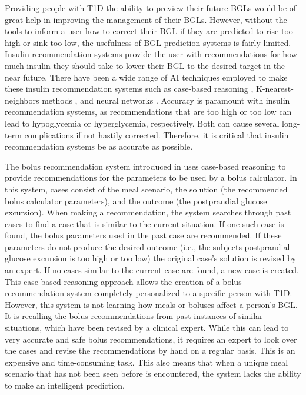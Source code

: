 Providing people with \ac{T1D} the ability to preview their future \ac{BGLs} would be of great help in improving the management of their BGLs. However, without the tools to inform a user how to correct their \ac{BGL} if they are predicted to rise too high or sink too low, the usefulness of \ac{BGL} prediction systems is fairly limited. Insulin recommendation systems provide the user with recommendations for how much insulin they should take to lower their \ac{BGL} to the desired target in the near future. There have been a wide range of AI techniques employed to make these insulin recommendation systems such as case-based reasoning \cite{pesl:case_based}, K-nearest-neighbors methods \cite{tyler:knn}, and neural networks \cite{zhu:bolus_drl}. Accuracy is paramount with insulin recommendation systems, as recommendations that are too high or too low can lead to hypoglycemia or hyperglycemia, respectively. Both can cause several long-term complications if not hastily corrected. Therefore, it is critical that insulin recommendation systems be as accurate as possible.

The bolus recommendation system introduced in \cite{pesl:case_based} uses case-based reasoning to provide recommendations for the parameters to be used by a bolus calculator. In this system, cases consist of the meal scenario, the solution (the recommended bolus calculator parameters), and the outcome (the postprandial glucose excursion). When making a recommendation, the system searches through past cases to find a case that is similar to the current situation. If one such case is found, the bolus parameters used in the past case are recommended. If these parameters do not produce the desired outcome (i.e., the subjects postprandial glucose excursion is too high or too low) the original case’s solution is revised by an expert. If no cases similar to the current case are found, a new case is created. This case-based reasoning approach allows the creation of a bolus recommendation system completely personalized to a specific person with \ac{T1D}. However, this system is not learning how meals or boluses affect a person’s \ac{BGL}. It is recalling the bolus recommendations from past instances of similar situations, which have been revised by a clinical expert. While this can lead to very accurate and safe bolus recommendations, it requires an expert to look over the cases and revise the recommendations by hand on a regular basis. This is an expensive and time-consuming task. This also means that when a unique meal scenario that has not been seen before is encountered, the system lacks the ability to make an intelligent prediction.

